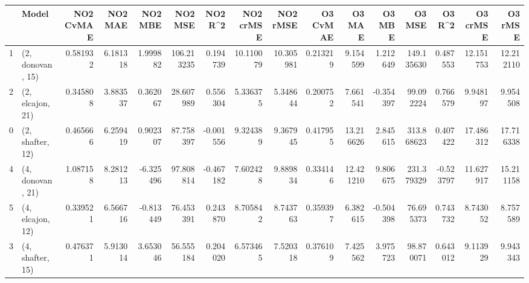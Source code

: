 \begin{tabular}{llrrrrrrrrrrrrrr}
\toprule
{} &             Model &  NO2 CvMAE &   NO2 MAE &   NO2 MBE &     NO2 MSE &   NO2 R\textasciicircum2 &  NO2 crMSE &   NO2 rMSE &  O3 CvMAE &     O3 MAE &    O3 MBE &      O3 MSE &    O3 R\textasciicircum2 &   O3 crMSE &    O3 rMSE \\
\midrule
1 &  (2, donovan, 15) &   0.581932 &  6.181318 &  1.999882 &  106.213235 &  0.194739 &  10.110079 &  10.305981 &  0.213219 &   9.154599 &  1.212649 &  149.135630 &  0.487553 &  12.151753 &  12.212110 \\
2 &  (2, elcajon, 21) &   0.345808 &  3.883537 &  0.362067 &   28.607989 &  0.556304 &   5.336375 &   5.348644 &  0.200752 &   7.661541 & -0.354397 &   99.092224 &  0.766579 &   9.948197 &   9.954508 \\
0 &  (2, shafter, 12) &   0.465666 &  6.259419 &  0.902307 &   87.758397 & -0.001556 &   9.324389 &   9.367945 &  0.417955 &  13.216626 &  2.845615 &  313.868623 &  0.407422 &  17.486312 &  17.716338 \\
4 &  (4, donovan, 21) &   1.087158 &  8.281213 & -6.325496 &   97.808814 & -0.467182 &   7.602428 &   9.889834 &  0.334146 &  12.421210 &  9.806675 &  231.379329 & -0.523797 &  11.627917 &  15.211158 \\
5 &  (4, elcajon, 12) &   0.339521 &  6.566716 & -0.813449 &   76.453391 &  0.243870 &   8.705842 &   8.743763 &  0.359397 &   6.382615 & -0.504398 &   76.695373 &  0.743732 &   8.743052 &   8.757589 \\
3 &  (4, shafter, 15) &   0.476371 &  5.913014 &  3.653046 &   56.555184 &  0.204020 &   6.573465 &   7.520318 &  0.376109 &   7.425562 &  3.975723 &   98.870071 &  0.643012 &   9.113929 &   9.943343 \\
\bottomrule
\end{tabular}
